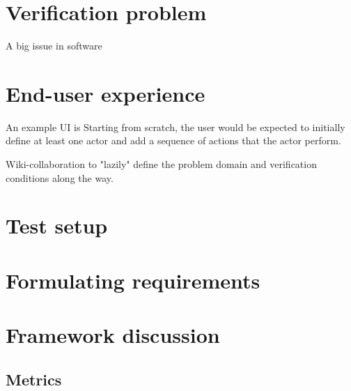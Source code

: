 \section{Verification problem}
A big issue in software

\section{End-user experience}


An example UI is Starting from scratch, the user would be expected to initially define at least one actor and add a sequence of actions that the actor perform.

Wiki-collaboration to "lazily" define the problem domain and verification conditions along the way.

\section{Test setup}

\section{Formulating requirements}

\section{Framework discussion}
\subsection{Metrics}
